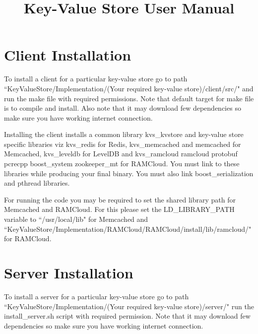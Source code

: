 \documentclass[11pt]{article}
\title{\textbf{Key-Value Store User Manual}}
\date{}
\begin{document}
\maketitle

\section{Client Installation}
To install a client for a particular key-value store go to path \\ ``KeyValueStore/Implementation/(Your required key-value store)/client/src/" and run the make file with required permissions. Note that default target for make file is to compile and install. Also note that it may download few dependencies so make sure you have working internet connection.

Installing the client installs a common library kvs\_kvstore and key-value store specific libraries viz kvs\_redis for Redis, kvs\_memcached and memcached for Memcached, kvs\_leveldb for LevelDB and kvs\_ramcloud ramcloud protobuf pcrecpp boost\_system zookeeper\_mt for RAMCloud. You must link to these libraries while producing your final binary. You must also link boost\_serialization and pthread libraries.

For running the code you may be required to set the shared library path for Memcached and RAMCloud. For this please set the LD\_LIBRARY\_PATH variable to ``/usr/local/lib" for Memcached and ``KeyValueStore/Implementation/RAMCloud/RAMCloud/install/lib/ramcloud/" for RAMCloud.
\section{Server Installation}
To install a server for a particular key-value store go to path \\ ``KeyValueStore/Implementation/(Your required key-value store)/server/" run the install\_server.sh script with required permission. Note that it may download few dependencies so make sure you have working internet connection.
\end{document}
